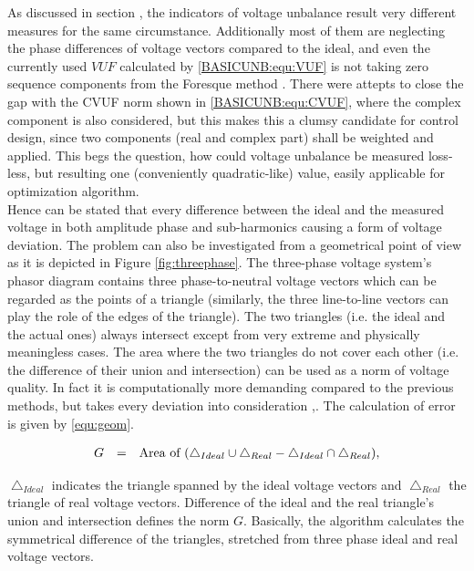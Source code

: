 As discussed in section , the indicators of voltage unbalance result very different measures for the same circumstance. Additionally most of them are neglecting the phase differences of voltage vectors compared to the ideal, and even the currently used $VUF$ calculated by \ref{BASICUNB:equ:VUF} is not taking zero sequence components from the Foresque method \cite{fortescue1918method}. There were attepts to close the gap with the CVUF norm shown in \ref{BASICUNB:equ:CVUF}, where the complex component is also considered, but this makes this a clumsy candidate for control design, since two components (real and complex part) shall be weighted and applied. This begs the question, how could voltage unbalance be measured loss-less, but resulting one (conveniently quadratic-like) value, easily applicable for optimization algorithm. \\
Hence can be stated that every difference between the ideal and the measured voltage in both amplitude phase and sub-harmonics causing a form of voltage deviation. The problem can also be investigated from a geometrical point of view as it is depicted in Figure \ref{fig:threephase}. The three-phase voltage system's phasor diagram contains three  phase-to-neutral voltage vectors which can be regarded as the points of a triangle (similarly, the three line-to-line vectors can play the role of the edges of the triangle). The two triangles (i.e. the ideal and the actual ones) always intersect except from very extreme and physically meaningless cases. The area where the two triangles do not cover each other (i.e. the difference of their union and intersection) can be used as a norm of voltage quality. In fact it is computationally more demanding compared to the previous methods, but takes every deviation into consideration \cite{Neukirchner2015},\cite{neukirchner2015examination}. The calculation of error is given by \ref{equ:geom}.

            \begin{equation}
                \begin{array}{rcl}
                       G&=&\textnormal{Area of }(\bigtriangleup_{Ideal}\cup\bigtriangleup_{Real}-\bigtriangleup_{Ideal}\cap\bigtriangleup_{Real}),
                \end{array}
                \label{equ:geom}
            \end{equation}

            $\bigtriangleup_{Ideal}$ indicates the triangle spanned by the ideal voltage vectors and $\bigtriangleup_{Real}$ the triangle of real voltage vectors. Difference of the ideal and the real triangle's union and intersection defines the norm $G$. Basically, the algorithm calculates the symmetrical difference of the triangles, stretched from three phase ideal and real voltage vectors.

